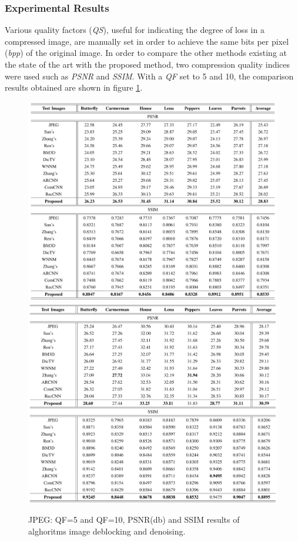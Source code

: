 \subsubsection{Experimental Results}
Various quality factors (\emph{QS}), useful for indicating the degree of loss in a 
compressed image, are manually set in order to achieve the same bits per 
pixel (\emph{bpp}) of the original image. In order to compare the other methods 
existing at the state of the art with the proposed method, two compression 
quality indices were used such as \emph{PSNR} and \emph{SSIM}. With a \emph{QF} set to 5 and 10, the 
comparison results obtained are shown in figure \ref{fig:QF5}.
\begin{figure}[htbp]
    \centering
    \includegraphics[width = 1 \linewidth]{images/paper3/comparison.png}
    \includegraphics[width = 1 \linewidth]{images/paper3/comparison2.png}
    \centering
    \caption{JPEG: QF=5 and QF=10, PSNR(db) and SSIM results of alghoritms image deblocking and denoising.}
    \label{fig:QF5}
\end{figure}
